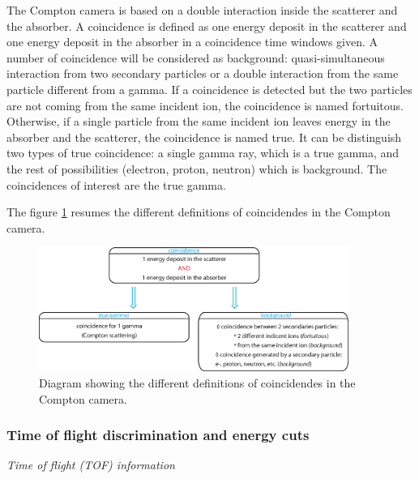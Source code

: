 \documentclass[12pt]{iopart}
\begin{document}
The Compton camera is based on a double interaction inside the scatterer and the absorber. A coincidence is defined as one energy deposit in the scatterer and one energy deposit in the absorber in a coincidence time windows given. A number of coincidence will be considered as background: quasi-simultaneous interaction from two secondary particles or a double interaction from the same particle different from a gamma.\newline
If a coincidence is detected but the two particles are not coming from the same incident ion, the coincidence is named fortuitous.
Otherwise, if a single particle from the same incident ion leaves energy in the absorber and the scatterer, the coincidence is named true.\newline
It can be distinguish two types of true coincidence: a single gamma ray, which is a true gamma, and the rest of possibilities (electron, proton, neutron) which is background. The coincidences of interest are the true gamma. 

The figure \ref{fig:fig_explication_coincidence_CC_simulation_Hadronth} resumes the different definitions of coincidendes in the Compton camera.
	\begin{figure} [!hbtp]	
	\centering
	\includegraphics[width=0.9\textwidth]{./Figure/Material_Methods/Schema_coincidence_EN.eps}
	\caption{Diagram showing the different definitions of coincidendes in the Compton camera.}
	 \label{fig:fig_explication_coincidence_CC_simulation_Hadronth}
	\end{figure}


\subsubsection{Time of flight discrimination and energy cuts\newline}

\textit{Time of flight (TOF) information}\newline
\end{document}
